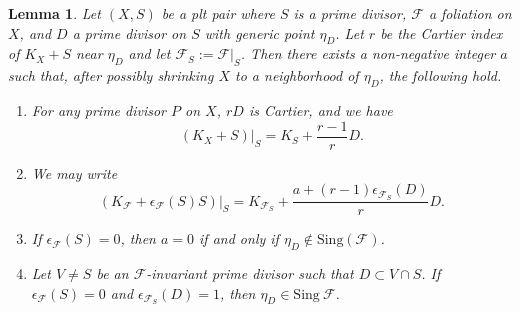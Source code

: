 \documentclass[11pt,reqno]{amsart}
\numberwithin{equation}{section}
\newcommand{\Ff}{\mathcal{F}}
\newcommand{\Sing}{\mathrm{Sing}}
\newtheorem{lem}[thm]{Lemma}
\theoremstyle{definition}
\begin{document}
\begin{lem}\label{lem: CS25 3.13(4) general case}
Let $(X,S)$ be a plt pair where $S$ is a prime divisor, $\Ff$ a foliation on $X$, and $D$ a prime divisor on $S$ with generic point $\eta_D$. Let $r$ be the Cartier index of $K_X+S$ near $\eta_D$ and let $\Ff_S:=\Ff|_S$. Then there exists a non-negative integer $a$ such that, after possibly shrinking $X$ to a neighborhood of $\eta_D$, the following hold.
\begin{enumerate}
    \item For any prime divisor $P$ on $X$, $rD$ is Cartier, and we have
    $$(K_X+S)|_S=K_S+\frac{r-1}{r}D.$$
    \item We may write
    $$(K_{\Ff}+\epsilon_{\Ff}(S)S)|_S=K_{\Ff_S}+\frac{a+(r-1)\epsilon_{\Ff_S}(D)}{r}D.$$
    \item If $\epsilon_{\Ff}(S)=0$, then $a=0$ if and only if $\eta_D\not\in\Sing(\Ff)$.
    \item Let $V\neq S$ be an $\mathcal F$-invariant prime divisor such that $D \subset V\cap S$. If $\epsilon_{\mathcal F}(S) = 0$ and $\epsilon_{\mathcal F_S}(D) = 1$, then $\eta_D \in \Sing ~ \mathcal F$.
\end{enumerate}
\end{lem}
\end{document}
